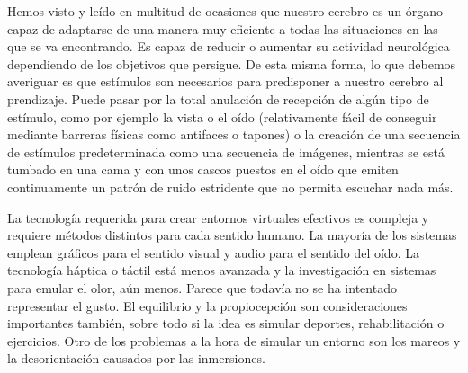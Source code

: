 \documentclass[twoside,twocolumn]{article}
\begin{document}
Hemos visto y le\'ido en multitud de ocasiones que nuestro cerebro es un \'organo capaz de adaptarse de una manera muy eficiente a todas las situaciones en las que se va encontrando. Es capaz de reducir o aumentar su actividad neurol\'ogica dependiendo de los objetivos que persigue. De esta misma forma, lo que debemos averiguar es que est\'imulos son necesarios para predisponer a nuestro cerebro al prendizaje. Puede pasar por la total anulaci\'on de recepci\'on de alg\'un tipo de est\'imulo, como por ejemplo la vista o el o\'ido (relativamente f\'acil de conseguir mediante barreras f\'isicas como antifaces o tapones) o la creaci\'on de una secuencia de est\'imulos predeterminada como una secuencia de im\'agenes, mientras se est\'a tumbado en una cama y con unos cascos puestos en el o\'ido que emiten continuamente un patr\'on de ruido estridente que no permita escuchar nada m\'as.

La tecnología requerida para crear entornos virtuales efectivos es compleja y requiere métodos distintos para cada sentido humano. La mayoría de los sistemas emplean gráficos para el sentido visual y audio para el sentido del oído. La tecnología háptica o táctil está menos avanzada y la investigación en sistemas para emular el olor, aún menos. Parece que todavía no se ha intentado representar el gusto. El equilibrio y la propiocepción son consideraciones importantes también, sobre todo si la idea es simular deportes, rehabilitación o ejercicios. Otro de los problemas a la hora de simular un entorno son los mareos y la desorientación causados por las inmersiones.

\medskip
\nocite{*}
\printbibliography
\end{document}
